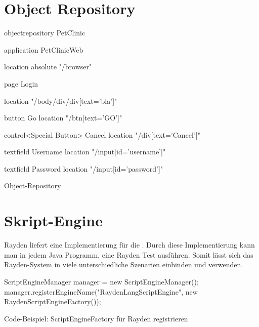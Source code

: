 \todo

\section{Object Repository}


\begin{program}
\begin{JavaCode}

objectrepository PetClinic {

	application PetClinicWeb {
		location absolute "/browser"
		
		page Login {
			location "/body/div/div[text='bla']"
			
			button Go {
				location "/btn[text='GO']"
			}
			
			control<Special Button> Cancel {
				location "/div[text='Cancel']"
			}
		
			textfield Username {
				location  "/input[id='username']"
			}
			
			textfield Password {
				location  "/input[id='password']"
			}			
		} 
	}
}
\end{JavaCode}
\caption{Object-Repository}
\label{prog:or}
\end{program}

\todo


\section{Skript-Engine}

Rayden liefert eine Implementierung für die . Durch diese Implementierung kann man in jedem Java Programm, eine Rayden Test ausführen. Somit lässt sich das Rayden-System in viele unterschiedliche Szenarien einbinden und verwenden. 

\begin{program}
\begin{JavaCode}
ScriptEngineManager manager = new ScriptEngineManager();
manager.registerEngineName("RaydenLangScriptEngine", new RaydenScriptEngineFactory());
\end{JavaCode}
\caption{Code-Beispiel: ScriptEngineFactory für Rayden registrieren}
\label{prog:registerFactory}
\end{program}

